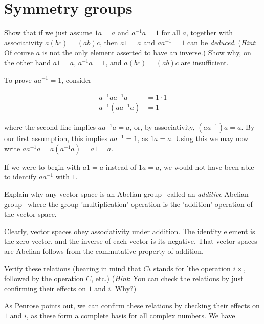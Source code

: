 \documentclass[../the-road-to-reality.tex]{subfiles}
\begin{document}
	
\section{Symmetry groups}

\begin{questions}

\question Show that if we just assume $1a = a$ and $a^{-1}a=1$ for all $a$, together with associativity $a(bc) = (ab)c$, then $a1 = a$ and $aa^{-1} = 1$ can be \textit{deduced}. (\textit{Hint}: Of course $a$ is not the only element asserted to have an inverse.) Show why, on the other hand $a1 = a$, $a^{-1}a = 1$, and $a(bc)=(ab)c$ are insufficient.

\begin{solution}
        To prove $aa^{-1}=1$, consider

        \begin{align*}
                a^{-1}aa^{-1}a &= 1 \cdot 1 \\
                a^{-1}(aa^{-1}a) &= 1
        \end{align*}

        where the second line implies $aa^{-1}a = a$, or, by associativity, $(aa^{-1})a = a$. By our first assumption, this implies $aa^{-1} = 1$, as $1a = a$. Using this we may now write $aa^{-1}a = a(a^{-1}a) = a1 = a$.

        If we were to begin with $a1 = a$ instead of $1a = a$, we would not have been able to identify $aa^{-1}$ with $1$.
\end{solution}

\question Explain why any vector space is an Abelian group$-$called an \textit{additive} Abelian group$-$where the group 'multiplication' operation is the 'addition' operation of the vector space.

\begin{solution}
        Clearly, vector spaces obey associativity under addition. The identity element is the zero vector, and the inverse of each vector is its negative. That vector spaces are Abelian follows from the commutative property of addition.
\end{solution}

\question Verify these relations (bearing in mind that $Ci$ stands for 'the operation $i\times$, followed by the operation $C$, etc.) (\textit{Hint}: You can check the relations by just confirming their effects on $1$ and $i$. Why?)

\begin{solution}
        As Penrose points out, we can confirm these relations by checking their effects on $1$ and $i$, as these form a complete basis for all complex numbers. We have


\end{solution}
\end{questions}
\end{document}
